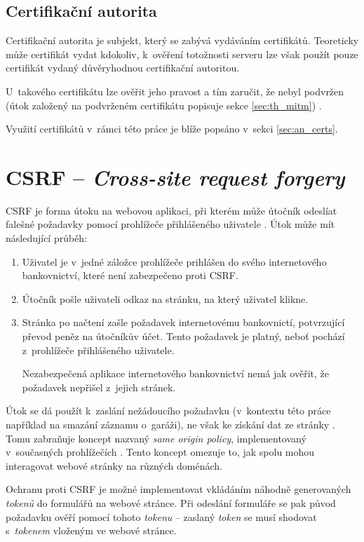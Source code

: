 \subsection{Certifikační autorita}

Certifikační autorita je subjekt, který se zabývá vydáváním certifikátů. Teoreticky může certifikát vydat kdokoliv, k~ověření totožnosti serveru lze však použít pouze certifikát vydaný důvěryhodnou certifikační autoritou.

U~takového certifikátu lze ověřit jeho pravost a tím zaručit, že nebyl podvržen (útok založený na podvrženém certifikátu popisuje sekce \ref{sec:th_mitm}) \cite{tcp_sec}.

Využití certifikátů v~rámci této práce je blíže popsáno v~sekci \ref{sec:an_certs}.

\section{CSRF -- \textit{Cross-site request forgery}}

CSRF je forma útoku na webovou aplikaci, při kterém může útočník odeslíat falešné požadavky pomocí prohlížeče přihlášeného uživatele \cite{csrf_owasp}. Útok může mít následující průběh:

\begin{enumerate}
    \item Uživatel je v~jedné záložce prohlížeče prihlášen do svého internetového bankovnictví, které není zabezpečeno proti CSRF.
    \item Útočník pošle uživateli odkaz na stránku, na který uživatel klikne.
    \item Stránka po načtení zašle požadavek internetovému bankovnictí, potvrzující převod peněz na útočníkův účet. Tento požadavek je platný, neboť pochází z~prohlížeče přihlášeného uživatele. 

    Nezabezpečená aplikace internetového bankovnictví nemá jak ověřit, že požadavek nepřišel z~jejich stránek.
\end{enumerate}

Útok se dá použít k~zaslání nežádoucího požadavku (v~kontextu této práce například na smazání záznamu o~garáži), ne však ke získání dat ze stránky \cite{csrf_owasp}. Tomu zabraňuje koncept nazvaný \textit{same origin policy}, implementovaný v~současných prohlížečích \cite{sec_handbook}. Tento koncept omezuje to, jak spolu mohou inter\-agovat webové stránky na různých doménách.

Ochranu proti CSRF je možné implementovat vkládáním náhodně generovaných \textit{tokenů} do formulářů na webové stránce. Při odeslání formuláře se pak původ požadavku ověří pomocí tohoto \textit{tokenu} -- zaslaný \textit{token} se musí shodovat s~\textit{tokenem} vloženým ve webové stránce.

